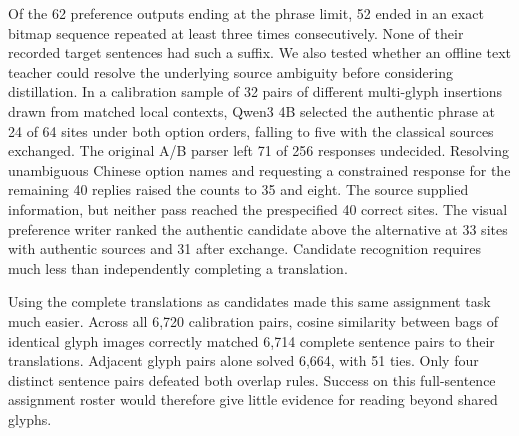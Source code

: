 Of the 62 preference outputs ending at the phrase limit, 52 ended in an exact bitmap sequence repeated at least three times consecutively. None of their recorded target sentences had such a suffix. We also tested whether an offline text teacher could resolve the underlying source ambiguity before considering distillation. In a calibration sample of 32 pairs of different multi-glyph insertions drawn from matched local contexts, Qwen3 4B selected the authentic phrase at 24 of 64 sites under both option orders, falling to five with the classical sources exchanged. The original A/B parser left 71 of 256 responses undecided. Resolving unambiguous Chinese option names and requesting a constrained response for the remaining 40 replies raised the counts to 35 and eight. The source supplied information, but neither pass reached the prespecified 40 correct sites. The visual preference writer ranked the authentic candidate above the alternative at 33 sites with authentic sources and 31 after exchange. Candidate recognition requires much less than independently completing a translation.

Using the complete translations as candidates made this same assignment task much easier. Across all 6,720 calibration pairs, cosine similarity between bags of identical glyph images correctly matched 6,714 complete sentence pairs to their translations. Adjacent glyph pairs alone solved 6,664, with 51 ties. Only four distinct sentence pairs defeated both overlap rules. Success on this full-sentence assignment roster would therefore give little evidence for reading beyond shared glyphs.
